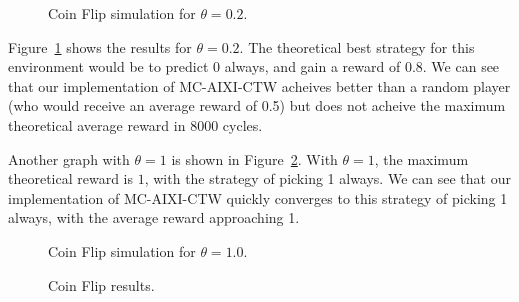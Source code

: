 \documentclass[pdftex,twoside,a4paper]{report}
\newcommand{\mac}{MC-AIXI-CTW}
\begin{document}
\begin{figure}[h]
\centering
\caption{Coin Flip simulation for $\theta=0.2$.}
\label{fig:coin_0_2}
\end{figure}
	
Figure~\ref{fig:coin_0_2} shows the results for $\theta=0.2$. The theoretical best strategy for this environment would be to predict $0$ always, and gain a reward of $0.8$. We can see that our implementation of \mac{} acheives better than a random player (who would receive an average reward of 0.5) but does not acheive the maximum theoretical average reward in 8000 cycles.

Another graph with $\theta = 1$ is shown in Figure~\ref{fig:coin_1_0}. With $\theta = 1$, the maximum theoretical reward is $1$, with the strategy of picking 1 always. We can see that our implementation of \mac{} quickly converges to this strategy of picking 1 always, with the average reward approaching 1.

\begin{figure}
\centering
\caption{Coin Flip simulation for $\theta=1.0$.}
\label{fig:coin_1_0}
\end{figure}

\begin{figure}[h]
\begin{center}
\end{center}
\caption{Coin Flip results.}
\label{fig:coinflip_results}
\end{figure}
\end{document}
